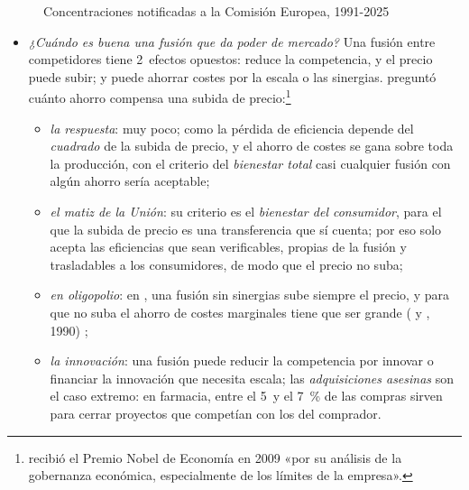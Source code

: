\documentclass[11pt]{article}
\begin{document}
\begin{figure}[H]
\centering
\caption{Concentraciones notificadas a la Comisión Europea, 1991-2025}\label{fig:concentraciones}
\end{figure}

\begin{itemize}
\item \emph{¿Cuándo es buena una fusión que da poder de mercado?} Una fusión entre competidores tiene 2~efectos opuestos: reduce la competencia, y el precio puede subir; y puede ahorrar costes por la escala o las sinergias. \textcite{Williamson1968Economies} preguntó cuánto ahorro compensa una subida de precio:\footnote{ recibió el Premio Nobel de Economía en 2009 «por su análisis de la gobernanza económica, especialmente de los límites de la empresa»\nocite{Nobel2009OstromWilliamson}.}
  \begin{itemize}
  \item \emph{la respuesta}: muy poco; como la pérdida de eficiencia depende del \emph{cuadrado} de la subida de precio, y el ahorro de costes se gana sobre toda la producción, con el criterio del \emph{bienestar total} casi cualquier fusión con algún ahorro sería aceptable;
  \item \emph{el matiz de la Unión}: su criterio es el \emph{bienestar del consumidor}, para el que la subida de precio es una transferencia que sí cuenta; por eso solo acepta las eficiencias que sean verificables, propias de la fusión y trasladables a los consumidores, de modo que el precio no suba;
  \item \emph{en oligopolio}: en , una fusión sin sinergias sube siempre el precio, y para que no suba el ahorro de costes marginales tiene que ser grande ( y , 1990)\nocite{FarrellShapiro1990Horizontal} ;
  \item \emph{la innovación}: una fusión puede reducir la competencia por innovar o financiar la innovación que necesita escala; las \emph{adquisiciones asesinas} son el caso extremo: en farmacia, entre el 5~y el 7~\% de las compras sirven para cerrar proyectos que competían con los del comprador\nocite{CunninghamEdererMa2021Killer}.

\end{itemize}
\end{itemize}
\end{document}
